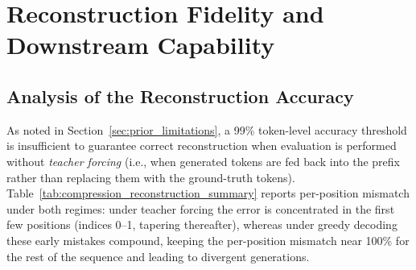 \begin{table}[t]
    \centering
    \caption{Learning-rate sweep of trajectory shape on SmolLM2-1.7B ($50$-sample runs; columns as in Table~\ref{tab:trajectory_cluster_structure}). The Euclidean dwelling signal $r_1$ is non-monotonic in the learning rate, peaking at the intermediate rate $0.5$ ($92\%$ of samples dwelling) and weakening at both $0.1$ and $1.0$.}
    \label{tab:trajectory_cluster_structure_lr}
    \begin{small}
    
    \end{small}
\vskip -0.1in
\end{table}


\section{Reconstruction Fidelity and Downstream Capability}
\label{app:part_downstream}

\subsection{Analysis of the Reconstruction Accuracy}
\label{app:I}

As noted in Section~\ref{sec:prior_limitations}, a 99\% token-level accuracy threshold is insufficient to guarantee correct reconstruction when evaluation is performed without \emph{teacher forcing} (i.e., when generated tokens are fed back into the prefix rather than replacing them with the ground-truth tokens). Table~\ref{tab:compression_reconstruction_summary} reports per-position mismatch under both regimes: under teacher forcing the error is concentrated in the first few positions (indices 0--1, tapering thereafter), whereas under greedy decoding these early mistakes compound, keeping the per-position mismatch near 100\% for the rest of the sequence and leading to divergent generations.
\begin{table}[t]
\centering
\caption{Compression reconstruction accuracy under non-ideal training convergence
(50 PG19 samples per setting). ``TF conv.'' is mean teacher-forcing accuracy over
all compressed samples; ``Greedy conv.'' is mean full-sequence match rate when
generating autoregressively from the compression embedding. We then report the
fraction of samples with a token mismatch at indices 0, 1, and 2 under two decoding
regimes: greedy autoregressive decoding (errors compound) and teacher forcing (each
position scored against the ground-truth prefix). Variants include ignoring the BOS
loss during training (no BOS) and upweighting the loss of the first two tokens by a
factor of three (2 leading).}
\label{tab:compression_reconstruction_summary}
\begin{small}

\end{small}
\vskip -0.1in
\end{table}



